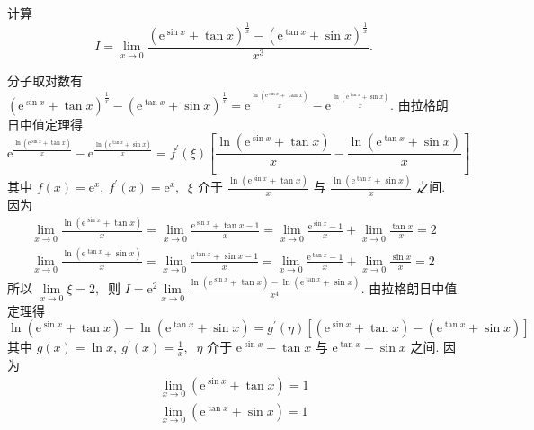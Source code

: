 	\newpage
	\begin{problem}
		计算$$I=\lim\limits_{x \rightarrow 0} \frac{\left(\mathrm{e}^{\sin x}+\tan x\right)^{\frac{1}{x}}-\left(\mathrm{e}^{\tan x}+\sin x\right)^{\frac{1}{x}}}{x^{3}} .$$
	\end{problem}
	\begin{solution}
		分子取对数有  $\left(\mathrm{e}^{\sin x}+\tan x\right)^{\frac{1}{x}}-\left(\mathrm{e}^{\tan x}+\sin x\right)^{\frac{1}{x}}=\mathrm{e}^{\frac{\ln \left(\mathrm{e}^{\sin x}+\tan x\right)}{x}}-\mathrm{e}^{\frac{\ln \left(\mathrm{e}^{\tan x}+\sin x\right)}{x}} .$ 由拉格朗日中值定理得
		$$\mathrm{e}^{\frac{\ln \left(\mathrm{e}^{\sin x}+\tan x\right)}{x}}-\mathrm{e}^{\frac{\ln \left(\mathrm{e}^{\tan x}+\sin x\right)}{x}}=f^{\prime}(\xi)\left[\frac{\ln \left(\mathrm{e}^{\sin x}+\tan x\right)}{x}-\frac{\ln \left(\mathrm{e}^{\tan x}+\sin x\right)}{x}\right]$$
		其中  $f(x)=\mathrm{e}^{x},\  f^{\prime}(x)=\mathrm{e}^{x},\ $ $\xi $ 介于  $\frac{\ln \left(\mathrm{e}^{\sin x}+\tan x\right)}{x}$  与  $\frac{\ln \left(\mathrm{e}^{\tan x}+\sin x\right)}{x} $ 之间. 因为
		$$\begin{array}{l}
			\lim\limits_{x \rightarrow 0} \frac{\ln \left(\mathrm{e}^{\sin x}+\tan x\right)}{x}=\lim\limits_{x \rightarrow 0} \frac{\mathrm{e}^{\sin x}+\tan x-1}{x}=\lim\limits _{x \rightarrow 0} \frac{\mathrm{e}^{\sin x}-1}{x}+\lim\limits _{x \rightarrow 0} \frac{\tan x}{x}=2 \\
			\lim\limits_{x \rightarrow 0} \frac{\ln \left(\mathrm{e}^{\tan x}+\sin x\right)}{x}=\lim\limits _{x \rightarrow 0} \frac{\mathrm{e}^{\tan x}+\sin x-1}{x}=\lim\limits _{x \rightarrow 0} \frac{\mathrm{e}^{\tan x}-1}{x}+\lim\limits _{x \rightarrow 0} \frac{\sin x}{x}=2
		\end{array}$$
		所以 $ \lim\limits_{x \rightarrow 0} \xi=2 ,\ $ 则  $I=\mathrm{e}^{2} \lim\limits_{x \rightarrow 0} \frac{\ln \left(\mathrm{e}^{\sin x}+\tan x\right)-\ln \left(\mathrm{e}^{\tan x}+\sin x\right)}{x^{4}} .$
		由拉格朗日中值定理得
		$$\ln \left(\mathrm{e}^{\sin x}+\tan x\right)-\ln \left(\mathrm{e}^{\tan x}+\sin x\right)=g^{\prime}(\eta)\left[\left(\mathrm{e}^{\sin x}+\tan x\right)-\left(\mathrm{e}^{\tan x}+\sin x\right)\right]$$
		其中  $g(x)=\ln x,\  g^{\prime}(x)=\frac{1}{x},\ $ $\eta $ 介于  $\mathrm{e}^{\sin x}+\tan x $ 与 $ \mathrm{e}^{\tan x}+\sin x $ 之间.
		因为
		$$\begin{array}{l}
			\lim _{x \rightarrow 0}\left(\mathrm{e}^{\sin x}+\tan x\right)=1 \\
			\lim _{x \rightarrow 0}\left(\mathrm{e}^{\tan x}+\sin x\right)=1

\end{array}$$
\end{solution}

